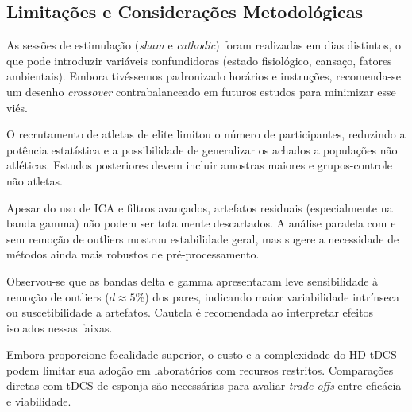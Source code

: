 \subsection{Limitações e Considerações Metodológicas}
As sessões de estimulação (\emph{sham} e \emph{cathodic}) foram realizadas em dias distintos, o que pode introduzir variáveis confundidoras (estado fisiológico, cansaço, fatores ambientais). Embora tivéssemos padronizado horários e instruções, recomenda-se um desenho \emph{crossover} contrabalanceado em futuros estudos para minimizar esse viés.

O recrutamento de atletas de elite limitou o número de participantes, reduzindo a potência estatística e a possibilidade de generalizar os achados a populações não atléticas. Estudos posteriores devem incluir amostras maiores e grupos-controle não atletas.

Apesar do uso de ICA e filtros avançados, artefatos residuais (especialmente na banda gamma) não podem ser totalmente descartados. A análise paralela com e sem remoção de outliers mostrou estabilidade geral, mas sugere a necessidade de métodos ainda mais robustos de pré-processamento.

Observou-se que as bandas delta e gamma apresentaram leve sensibilidade à remoção de outliers (\(d\approx5\)\%) dos pares, indicando maior variabilidade intrínseca ou suscetibilidade a artefatos. Cautela é recomendada ao interpretar efeitos isolados nessas faixas.

Embora proporcione focalidade superior, o custo e a complexidade do HD-tDCS podem limitar sua adoção em laboratórios com recursos restritos. Comparações diretas com tDCS de esponja são necessárias para avaliar \textit{trade-offs} entre eficácia e viabilidade.
